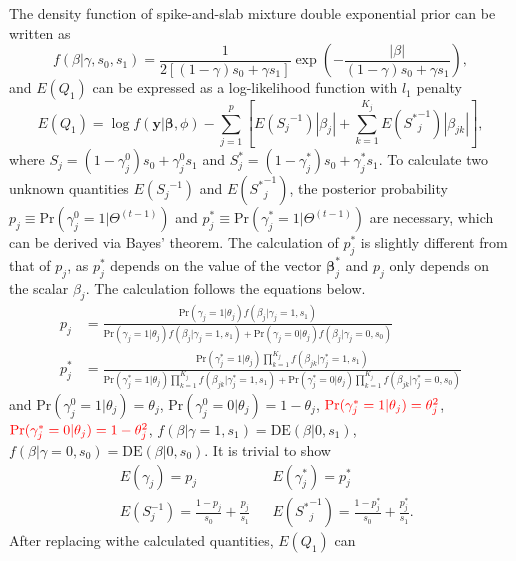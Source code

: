 \documentclass[AMA,STIX1COL,]{WileyNJD-v2}
\begin{document}
The density function of spike-and-slab mixture double exponential prior
can be written as \[
f(\beta|\gamma, s_0, s_1) = \frac{1}{2\left[(1-\gamma)s_0 + \gamma s_1\right]}\exp(-\frac{|\beta|}{(1-\gamma)s_0 + \gamma s_1}),
\] and \(E(Q_1)\) can be expressed as a log-likelihood function with
\(l_1\) penalty \begin{equation}\label{eq:Q1_CD}
E(Q_1) = \log f(\textbf{y}|\boldsymbol{\beta}, \phi) - \sum\limits_{j=1}^p\left[E({S_j}^{-1})|\beta_j|+\sum\limits_{k=1}^{K_j}E({S^{*}}^{-1}_{j})|\beta_{jk}|\right],
\end{equation} where
\(S_{j} = (1-\gamma^{0}_{j}) s_0 + \gamma^{0}_{j} s_1\) and
\(S^*_{j} = (1-\gamma^*_{j}) s_0 + \gamma^*_{j} s_1\). To calculate two
unknown quantities \(E({S_j}^{-1})\) and \(E({S^*}^{-1}_j)\), the
posterior probability
\(p_{j} \equiv \text{Pr}(\gamma^{0}_{j}=1|\Theta^{(t-1)})\) and
\(p_{j}^*\equiv \text{Pr}(\gamma^*_{j}=1|\Theta^{(t-1)})\) are
necessary, which can be derived via Bayes' theorem. The calculation of
\(p_j^*\) is slightly different from that of \(p_j\), as \(p_j^*\)
depends on the value of the vector \(\boldsymbol{\beta}^*_{j}\) and
\(p_j\) only depends on the scalar \(\beta_j\). The calculation follows
the equations below. \begin{align*}
p_{j} &= \frac{\text{Pr}(\gamma_{j} = 1|\theta_j)f(\beta_{j}|\gamma_{j}=1, s_1) }{\text{Pr}(\gamma_{j} = 1|\theta_j)f(\beta_{j}|\gamma_{j}=1, s_1) + \text{Pr}(\gamma_{j} = 0|\theta_j)f(\beta_{j}|\gamma_{j}=0, s_0)}\\
p^*_{j} &= \frac{\text{Pr}(\gamma^{*}_{j} = 1|\theta_j)\prod\limits_{k=1}^{K_j}f(\beta_{jk}|\gamma^{*}_{j}=1, s_1) }{\text{Pr}(\gamma^{*}_{j} = 1|\theta_j)\prod\limits_{k=1}^{K_j}f(\beta_{jk}|\gamma^{*}_{j}=1, s_1) + \text{Pr}(\gamma^{*}_{j} = 0|\theta_j)\prod\limits_{k=1}^{K_j}f(\beta_{jk}|\gamma^{*}_{j}=0, s_0)}
\end{align*} and \(\text{Pr}(\gamma_{j}^{0} = 1|\theta_j) = \theta_j\),
\(\text{Pr}(\gamma_{j}^{0} = 0|\theta_j) = 1-\theta_j\),
\(\textcolor{red}{\text{Pr}(\gamma_{j}^*= 1|\theta_j) = \theta_j^2}\),
\(\textcolor{red}{\text{Pr}(\gamma_{j}^*= 0|\theta_j) = 1-\theta^2_j}\),
\(f(\beta|\gamma=1, s_1) = \text{DE}(\beta|0 , s_1)\),
\(f(\beta|\gamma=0, s_0) = \text{DE}(\beta|0 , s_0)\). It is trivial to
show \begin{align}\label{eq:exp_scale}
&E(\gamma_{j})  = p_{j} & &E(\gamma^{*}_{j}) = p_{j}^{*}\nonumber\\
&E({S}^{-1}_{j}) = \frac{1-p_{j}}{s_0} + \frac{p_{j}}{s_1} & &E({S^*}^{-1}_{j}) = \frac{1-p_{j}^{*}}{s_0} + \frac{p_{j}^{*}}{s_1}.
\end{align} After replacing withe calculated quantities, \(E(Q_1)\) can
\end{document}
